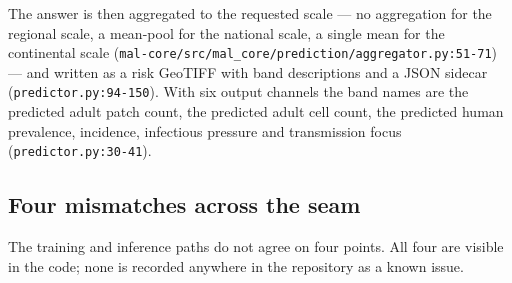 \documentclass[11pt,a4paper]{article}
\newcommand{\codex}[1]{\texttt{#1}}
\begin{document}
The answer is then aggregated to the requested scale --- no aggregation for
the regional scale, a mean-pool for the national scale, a single mean for the
continental scale (\codex{mal-core/\allowbreak{}src/\allowbreak{}mal\_\allowbreak{}core/\allowbreak{}prediction/\allowbreak{}aggregator.py:51-71})
--- and written as a risk GeoTIFF with band descriptions and a JSON sidecar
(\codex{predictor.py:94-150}). With six output channels the band names are the
predicted adult patch count, the predicted adult cell count, the predicted
human prevalence, incidence, infectious pressure and transmission focus
(\codex{predictor.py:30-41}).

\subsection{Four mismatches across the seam}

The training and inference paths do not agree on four points. All four are
visible in the code; none is recorded anywhere in the repository as a known
issue.
\end{document}
